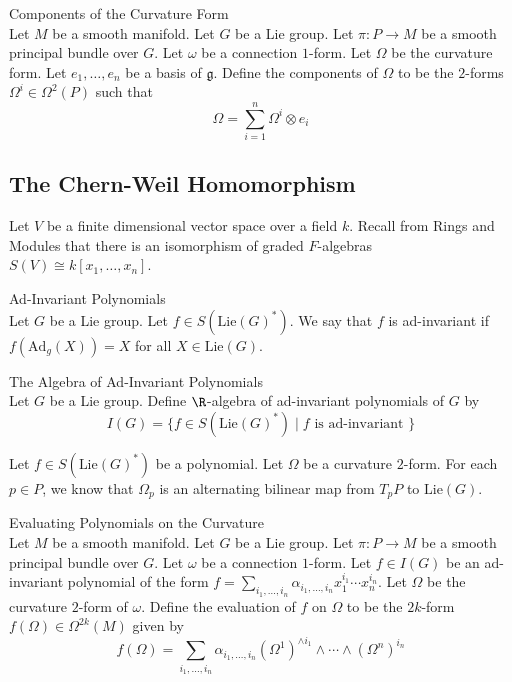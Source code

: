 \documentclass[a4paper]{article}
\begin{document}
\begin{defn}{Components of the Curvature Form}{}\\
Let $M$ be a smooth manifold. Let $G$ be a Lie group. Let $\pi:P\to M$ be a smooth principal bundle over $G$. Let $\omega$ be a connection $1$-form. Let $\Omega$ be the curvature form. Let $e_1,\dots,e_n$ be a basis of $\mathfrak{g}$. Define the components of $\Omega$ to be the $2$-forms $\Omega^i\in\Omega^2(P)$ such that $$\Omega=\sum_{i=1}^n\Omega^i\otimes e_i$$
\end{defn}

\subsection{The Chern-Weil Homomorphism}
Let $V$ be a finite dimensional vector space over a field $k$. Recall from Rings and Modules that there is an isomorphism of graded $F$-algebras $S(V)\cong k[x_1,\dots,x_n]$. 

\begin{defn}{Ad-Invariant Polynomials}{}\\
Let $G$ be a Lie group. Let $f\in S(\text{Lie}(G)^\ast)$. We say that $f$ is ad-invariant if $f(\text{Ad}_g(X))=X$ for all $X\in\text{Lie}(G)$. 
\end{defn}

\begin{defn}{The Algebra of Ad-Invariant Polynomials}{}\\
Let $G$ be a Lie group. Define $\R$-algebra of ad-invariant polynomials  of $G$ by $$I(G)=\{f\in S(\text{Lie}(G)^\ast)\;|\;f\text{ is ad-invariant }\}$$
\end{defn}

Let $f\in S(\text{Lie}(G)^\ast)$ be a polynomial. Let $\Omega$ be a curvature $2$-form. For each $p\in P$, we know that $\Omega_p$ is an alternating bilinear map from $T_pP$ to $\text{Lie}(G)$. 

\begin{defn}{Evaluating Polynomials on the Curvature}{}\\
Let $M$ be a smooth manifold. Let $G$ be a Lie group. Let $\pi:P\to M$ be a smooth principal bundle over $G$. Let $\omega$ be a connection $1$-form. Let $f\in I(G)$ be an ad-invariant polynomial of the form $f=\sum_{i_1,\dots,i_n}\alpha_{i_1,\dots,i_n}x_1^{i_1}\cdots x_n^{i_n}$. Let $\Omega$ be the curvature $2$-form of $\omega$. Define the evaluation of $f$ on $\Omega$ to be the $2k$-form $f(\Omega)\in\Omega^{2k}(M)$ given by $$f(\Omega)=\sum_{i_1,\dots,i_n}\alpha_{i_1,\dots,i_n}(\Omega^1)^{\wedge i_1}\wedge\cdots \wedge(\Omega^n)^{i_n}$$
\end{defn}
\end{document}
